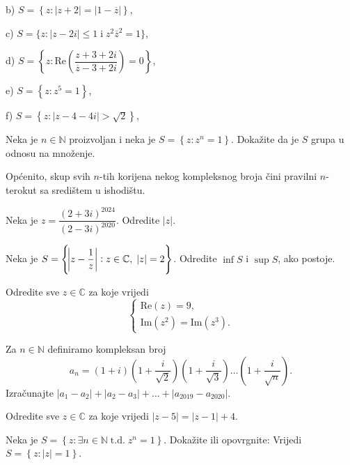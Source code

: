 \begin{exercise}
\begin{exercise}
\begin{AutoMultiColItemize}
\item[b)] $S=\left\{z : |z+2|=|1-\overline{z}|\right\}$,
\item[c)] $S=\{z : |z-2i|\leq 1 \; \mathrm{i} \; z^2\overline{z}^2=1\}$,
\item[d)] $S=\left\{z : \mathrm{Re}\left(\dfrac{z+3+2i}{\overline{z}-3+2i}\right)=0\right\}$,
\item[e)] $S=\left\{z : z^5=1\right\}$,
\item[f)] $S=\left\{z : |z-4-4i|>\sqrt{2}\right\}$,
\end{AutoMultiColItemize}
\end{exercise}
\begin{exercise}
Neka je $n\in \mathbb{N}$ proizvoljan i neka je $S=\left\{z : z^n=1 \right\}$. Dokažite da je $S$ grupa u odnosu na množenje.
\end{exercise}
Općenito, skup svih $n$-tih korijena nekog kompleksnog broja čini pravilni $n$-terokut sa središtem u ishodištu.
\begin{exercise}
Neka je $z=\dfrac{(2+3i)^{2024}}{(2-3i)^{2020}}$. Odredite $|z|$.
\end{exercise}
\begin{exercise}
Neka je $S=\left\{\abs{z-\dfrac{1}{z}} : z\in \mathbb{C},\; |z|=2\right\}$. Odredite $\inf{S}$ i $\sup{S}$, ako postoje.
\end{exercise}
\begin{exercise}
Odredite sve $z\in \mathbb{C}$ za koje vrijedi
$$\begin{cases}
\mathrm{Re}(z)=9, \\
\mathrm{Im}(z^2)=\mathrm{Im}(z^3).
   \end{cases}$$
\end{exercise}
\begin{exercise}
Za $n\in \mathbb{N}$ definiramo kompleksan broj
$$a_n=(1+i)\left(1+\dfrac{i}{\sqrt{2}}\right)\left(1+\dfrac{i}{\sqrt{3}}\right)\dots \left(1+\dfrac{i}{\sqrt{n}}\right).$$
Izračunajte $|a_1-a_2|+|a_2-a_3|+\dots+|a_{2019}-a_{2020}|$.
\end{exercise}
\begin{exercise}
Odredite sve $z\in \mathbb{C}$ za koje vrijedi $|z-5|=|z-1|+4$.
\end{exercise}
\begin{exercise}
Neka je $S=\left\{z : \exists{n}\in \mathbb{N}\;\mathrm{t. d.}\; z^n=1 \right\}$. Dokažite ili opovrgnite: Vrijedi $S=\left\{z : |z|=1 \right\}$.
\end{exercise}
\begin{exercise}

\end{exercise}
\end{exercise}

